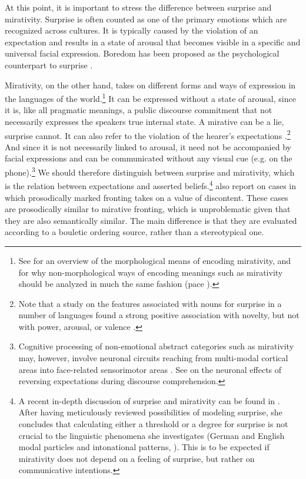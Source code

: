 At this point, it is important to stress the difference between surprise and mirativity. Surprise is often counted as one of the primary emotions which are recognized across cultures. It is typically caused by the violation of an expectation and results in a state of arousal that becomes visible in a specific and universal facial expression. Boredom has been proposed as the psychological counterpart to surprise \citep[139, 406, 831, 1053]{VandenBos.2015}.
 
Mirativity, on the other hand, takes on different forms and ways of expression in the languages of the world.\footnote{See \citet{DeLancey.2012} for an overview of the morphological means of encoding mirativity, and \citet{DiewaldSmirnova.2010} for why non-morphological ways of encoding meanings such as mirativity should be analyzed in much the same fashion (pace \cite{Aikhenvald.2012}).} It can be expressed without a state of arousal, since it is, like all pragmatic meanings, a public discourse commitment \citep{FarkasBruce.2010} that not necessarily expresses the speakers  true internal state. A mirative can be a lie, surprise cannot. It can also refer to the violation of the hearer's expectations \citep{HengeveldOlbertz.2012,RettSturman.2020}.\footnote{Note that a study on the features associated with nouns for surprise in a number of languages found a strong positive association with novelty, but not with power, arousal, or valence \citep{FontaineSchererSoriano.2013}.} And since it is not necessarily linked to arousal, it need not be accompanied by facial expressions and can be communicated without any visual cue (e.g. on the phone).\footnote{Cognitive processing of non-emotional abstract categories such as mirativity may, however, involve neuronal circuits reaching from multi-modal cortical areas into face-related sensorimotor areas \citep{DreyerPulvermueller.2018}. See \citet{XiangKuperberg.2014} on the neuronal effects of reversing expectations during discourse comprehension.} We should therefore distinguish between surprise and mirativity, which is the relation between expectations and asserted beliefs.\footnote{A recent in-depth discussion of surprise and mirativity can be found in \citet[35--77]{Kraus.2018}. After having meticulously reviewed possibilities of modeling surprise, she concludes that calculating either a threshold or a degree for surprise is not crucial to the linguistic phenomena she investigates (German and English modal particles and intonational patterns, \citealt[53]{Kraus.2018}). This is to be expected if mirativity does not depend on a feeling of surprise, but rather on communicative intentions.} \citet[16]{BianchiBocciCruschina.2016} also report on cases in which prosodically marked fronting takes on a value of discontent. These cases are prosodically similar to mirative fronting, which is unproblematic given that they are also semantically similar. The main difference is that they are evaluated according to a bouletic ordering source, rather than a stereotypical one.

